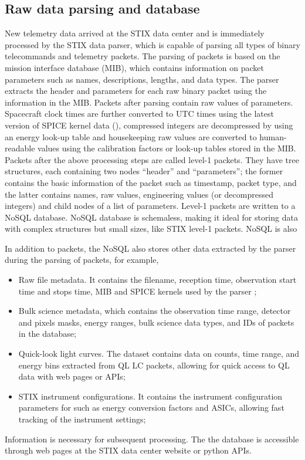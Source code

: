 \documentclass[referee]{aa} %
\begin{document}
\subsection{Raw data parsing and database}
New telemetry data arrived at the STIX data center and is immediately processed by the STIX data parser, which is capable of parsing all types of binary telecommands and telemetry packets.   The parsing of packets is based on the mission interface database (MIB), which 
contains information on packet parameters such as names, descriptions, lengths, and
data types. The parser extracts the header and parameters for each raw binary packet
using the information in the MIB.
Packets after parsing contain raw values of parameters. 
 Spacecraft clock times are further converted to UTC times using 
the latest version of SPICE kernel data (\cite{spice1996,spice2018}), compressed integers are  
decompressed by using an energy look-up table and 
housekeeping raw values are converted to 
human-readable values using the calibration factors or look-up tables stored in the MIB. 
Packets after the above processing steps are called level-1 packets. They
have tree structures, each containing two nodes “header” and “parameters”;
the former contains the basic information  of the packet such as timestamp, packet type,
and the latter contains names, 
raw values, engineering values (or decompressed integers) and child nodes of a list of parameters.
Level-1 packets are written 
to a NoSQL database. 
NoSQL database is schemaless,  making it ideal for storing data with complex
structures but small sizes, like STIX level-1 packets.  
NoSQL is also 

In addition to packets, the NoSQL also stores other data extracted by the parser during the parsing of packets, 
for example, 
\begin{itemize}
  \item Raw file metadata. It contains the filename, reception time, observation start time and stops time, MIB and SPICE kernels used by the parser ; 
  \item Bulk science metadata, which contains the observation time range, detector and pixels masks, energy ranges, 
   bulk science data types, and IDs of packets in the database; 
  \item Quick-look light curves.  The dataset contains data on counts, time range, and energy bins extracted from QL LC packets, 
     allowing for quick access to QL data with web pages or APIs;
  \item STIX instrument configurations. 
  It contains the instrument configuration parameters for such as energy conversion factors and ASICs, 
  allowing fast tracking of the instrument settings;
\end{itemize}
Information is necessary for subsequent processing. The
the database is accessible through web pages at the STIX data center website or python APIs. 
\end{document}
